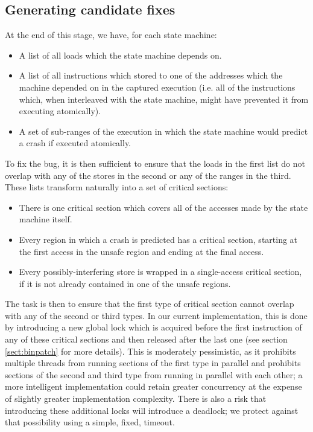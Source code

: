 \documentclass[10pt,twocolumn,preprint,natbib,authoryear]{sigplanconf}
\begin{document}
\subsection{Generating candidate fixes}
\label{sect:gen_fix}

At the end of this stage, we have, for each state machine:

\begin{itemize}
\item A list of all loads which the state machine depends on.
\item A list of all instructions which stored to one of the addresses
  which the machine depended on in the captured execution (i.e. all of
  the instructions which, when interleaved with the state machine,
  might have prevented it from executing atomically).
\item A set of sub-ranges of the execution in which the state machine
  would predict a crash if executed atomically.
\end{itemize}

To fix the bug, it is then sufficient to ensure that the loads in the
first list do not overlap with any of the stores in the second or any
of the ranges in the third.  These lists transform naturally into a
set of critical sections:

\begin{itemize}
\item There is one critical section which covers all of the accesses
  made by the state machine itself.
\item Every region in which a crash is predicted has a critical
  section, starting at the first access in the unsafe region and
  ending at the final access.
\item Every possibly-interfering store is wrapped in a single-access
  critical section, if it is not already contained in one of the
  unsafe regions.
\end{itemize}

The task is then to ensure that the first type of critical section
cannot overlap with any of the second or third types.  In our current
implementation, this is done by introducing a new global lock which is
acquired before the first instruction of any of these critical
sections and then released after the last one (see section
\ref{sect:binpatch} for more details).  This is moderately
pessimistic, as it prohibits multiple threads from running sections of
the first type in parallel and prohibits sections of the second and
third type from running in parallel with each other; a more
intelligent implementation could retain greater concurrency at the
expense of slightly greater implementation complexity.  There is also
a risk that introducing these additional locks will introduce a
deadlock; we protect against that possibility using a simple, fixed,
timeout.
\end{document}
